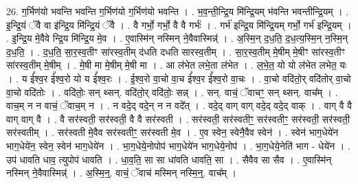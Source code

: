 \documentclass[17pt]{extarticle}
\begin{document}
26. ग॒र्भिण॑यो भवन्ति भवन्ति ग॒र्भिण॑यो ग॒र्भिण॑यो भवन्ति । . भ॒व॒न्ती॒न्द्रि॒य मि॑न्द्रि॒यम् भ॑वन्ति भवन्तीन्द्रि॒यम् । . इ॒न्द्रि॒यं ॅवै वा इ॑न्द्रि॒य मि॑न्द्रि॒यं ॅवै । . वै गर्भो॒ गर्भो॒ वै वै गर्भः॑ । . गर्भ॑ इन्द्रि॒य मि॑न्द्रि॒यम् गर्भो॒ गर्भ॑ इन्द्रि॒यम् । . इ॒न्द्रि॒य मे॒वैवे न्द्रि॒य मि॑न्द्रि॒य मे॒व । . ए॒वास्मि॑न् नस्मिन् ने॒वैवास्मिन्न्॑ । . अ॒स्मि॒न् द॒ध॒ति॒ द॒ध॒त्य॒स्मि॒न् न॒स्मि॒न् द॒ध॒ति॒ । . द॒ध॒ति॒ सा॒र॒स्व॒तीꣳ सा॑रस्व॒तीम् द॑धति दधति सारस्व॒तीम् । . सा॒र॒स्व॒तीम् मे॒षीम् मे॒षीꣳ सा॑रस्व॒तीꣳ सा॑रस्व॒तीम् मे॒षीम् । . मे॒षी मा मे॒षीम् मे॒षी मा । . आ ल॑भेत लभे॒ता ल॑भेत । . ल॒भे॒त॒ यो यो ल॑भेत लभेत॒ यः । . य ई᳚श्व॒र ई᳚श्व॒रो यो य ई᳚श्व॒रः । . ई॒श्व॒रो वा॒चो वा॒च ई᳚श्व॒र ई᳚श्व॒रो वा॒चः । . वा॒चो वदि॑तो॒र् वदि॑तोर् वा॒चो वा॒चो वदि॑तोः । . वदि॑तोः॒ सन् थ्सन्. वदि॑तो॒र् वदि॑तोः॒ सन्न् । . सन्. वाचं॒ ॅवाचꣳ॒॒ सन् थ्सन्. वाच᳚म् । . वाच॒म् न न वाचं॒ ॅवाच॒म् न । . न वदे॒द् वदे॒न् न न वदे᳚त् । . वदे॒द् वाग् वाग् वदे॒द् वदे॒द् वाक् । . वाग् वै वै वाग् वाग् वै । . वै सर॑स्वती॒ सर॑स्वती॒ वै वै सर॑स्वती । . सर॑स्वती॒ सर॑स्वतीꣳ॒॒ सर॑स्वतीꣳ॒॒ सर॑स्वती॒ सर॑स्वती॒ सर॑स्वतीम् । . सर॑स्वती मे॒वैव सर॑स्वतीꣳ॒॒ सर॑स्वती मे॒व । . ए॒व स्वेन॒ स्वेनै॒वैव स्वेन॑ । . स्वेन॑ भाग॒धेये॑न भाग॒धेये॑न॒ स्वेन॒ स्वेन॑ भाग॒धेये॑न । . भा॒ग॒धेये॒नोपोप॑ भाग॒धेये॑न भाग॒धेये॒नोप॑ । . भा॒ग॒धेये॒नेति॑ भाग - धेये॑न । . उप॑ धावति धाव॒ त्युपोप॑ धावति । . धा॒व॒ति॒ सा सा धा॑वति धावति॒ सा । . सैवैव सा सैव । . ए॒वास्मि॑न् नस्मिन् ने॒वैवास्मिन्न्॑ । . अ॒स्मि॒न्॒. वाचं॒ ॅवाच॑ मस्मिन् नस्मि॒न्॒. वाच᳚म् । \newline
\end{document}
